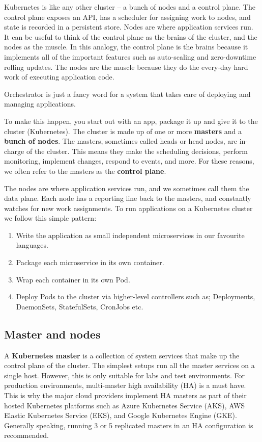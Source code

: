 \documentclass[10pt,a4paper]{report}
\begin{document}
Kubernetes is like any other cluster – a bunch of nodes and a control plane. The control plane exposes an API, has a scheduler for assigning work to nodes, and state is recorded in a persistent store. Nodes are where application services run.
It can be useful to think of the control plane as the brains of the cluster, and the nodes as the muscle. In this analogy, the control plane is the brains because it implements all of the important features such as auto-scaling and zero-downtime rolling updates. The nodes are the muscle because they do the every-day hard work of
executing application code.

Orchestrator is just a fancy word for a system that takes care of deploying and managing applications. 

To make this happen, you start out with an app, package it up and give it to the cluster (Kubernetes). The cluster is made up of one or more \textbf{masters} and a \textbf{bunch of nodes}.
The masters, sometimes called heads or head nodes, are in-charge of the cluster. This means they make the scheduling decisions, perform monitoring, implement changes, respond to events, and more. For these reasons, we often refer to the masters as the \textbf{control plane}. 

The nodes are where application services run, and we sometimes call them the data plane. Each node has a reporting line back to the masters, and constantly watches for new work assignments. To run applications on a Kubernetes cluster we follow this simple pattern:
\begin{enumerate}
	\item Write the application as small independent microservices in our favourite languages.
	\item Package each microservice in its own container.
	\item Wrap each container in its own Pod.
	\item Deploy Pods to the cluster via higher-level controllers such as; Deployments, DaemonSets, StatefulSets, CronJobs etc.
\end{enumerate}

\subsection{Master and nodes}
A \textbf{Kubernetes master} is a collection of system services that make up the control plane of the cluster. The simplest setups run all the master services on a single host. However, this is only suitable for labs and test environments. For production environments, multi-master high availability (HA) is a must have. This is why the major cloud providers implement HA masters as part of their hosted Kubernetes platforms such as Azure Kubernetes Service (AKS), AWS Elastic Kubernetes Service (EKS), and Google Kubernetes Engine (GKE).
Generally speaking, running 3 or 5 replicated masters in an HA configuration is recommended.
\end{document}
